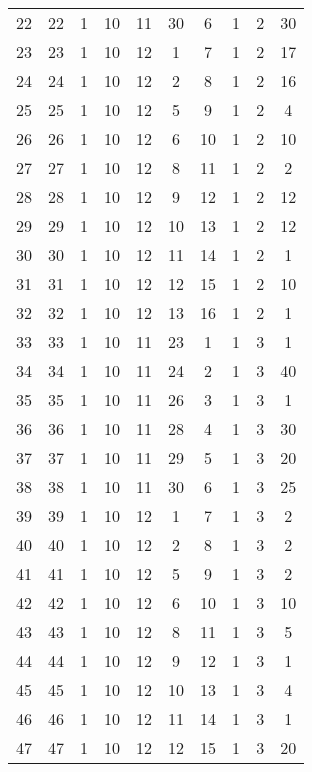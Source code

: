 \begin{longtable}{cccccccccc}
  22 &  22 &   1 &  10 &  11 &  30 &   6 &   1 &   2 &  30 \\ 
  23 &  23 &   1 &  10 &  12 &   1 &   7 &   1 &   2 &  17 \\ 
  24 &  24 &   1 &  10 &  12 &   2 &   8 &   1 &   2 &  16 \\ 
  25 &  25 &   1 &  10 &  12 &   5 &   9 &   1 &   2 &   4 \\ 
  26 &  26 &   1 &  10 &  12 &   6 &  10 &   1 &   2 &  10 \\ 
  27 &  27 &   1 &  10 &  12 &   8 &  11 &   1 &   2 &   2 \\ 
  28 &  28 &   1 &  10 &  12 &   9 &  12 &   1 &   2 &  12 \\ 
  29 &  29 &   1 &  10 &  12 &  10 &  13 &   1 &   2 &  12 \\ 
  30 &  30 &   1 &  10 &  12 &  11 &  14 &   1 &   2 &   1 \\ 
  31 &  31 &   1 &  10 &  12 &  12 &  15 &   1 &   2 &  10 \\ 
  32 &  32 &   1 &  10 &  12 &  13 &  16 &   1 &   2 &   1 \\ 
  33 &  33 &   1 &  10 &  11 &  23 &   1 &   1 &   3 &   1 \\ 
  34 &  34 &   1 &  10 &  11 &  24 &   2 &   1 &   3 &  40 \\ 
  35 &  35 &   1 &  10 &  11 &  26 &   3 &   1 &   3 &   1 \\ 
  36 &  36 &   1 &  10 &  11 &  28 &   4 &   1 &   3 &  30 \\ 
  37 &  37 &   1 &  10 &  11 &  29 &   5 &   1 &   3 &  20 \\ 
  38 &  38 &   1 &  10 &  11 &  30 &   6 &   1 &   3 &  25 \\ 
  39 &  39 &   1 &  10 &  12 &   1 &   7 &   1 &   3 &   2 \\ 
  40 &  40 &   1 &  10 &  12 &   2 &   8 &   1 &   3 &   2 \\ 
  41 &  41 &   1 &  10 &  12 &   5 &   9 &   1 &   3 &   2 \\ 
  42 &  42 &   1 &  10 &  12 &   6 &  10 &   1 &   3 &  10 \\ 
  43 &  43 &   1 &  10 &  12 &   8 &  11 &   1 &   3 &   5 \\ 
  44 &  44 &   1 &  10 &  12 &   9 &  12 &   1 &   3 &   1 \\ 
  45 &  45 &   1 &  10 &  12 &  10 &  13 &   1 &   3 &   4 \\ 
  46 &  46 &   1 &  10 &  12 &  11 &  14 &   1 &   3 &   1 \\ 
  47 &  47 &   1 &  10 &  12 &  12 &  15 &   1 &   3 &  20 \\ 

\end{longtable}
